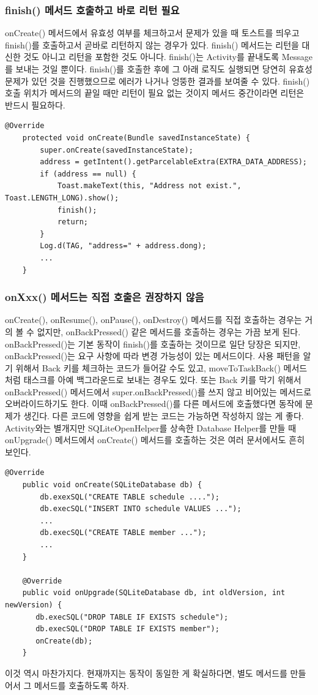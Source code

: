 \subsubsection{finish() 메서드 호출하고 바로 리턴 필요}
onCreate() 메서드에서 유효성 여부를 체크하고서 문제가 있을 때 토스트를 띄우고 finish()를 호출하고서 곧바로 리턴하지 않는 경우가 있다. 
finish() 메서드는 리턴을 대신한 것도 아니고 리턴을 포함한 것도 아니다. finish()는 Activity를 끝내도록 Message를 보내는 것일 뿐이다. 
finish()를 호출한 후에 그 아래 로직도 실행되면 당연히 유효성 문제가 있던 것을 진행했으므로 에러가 나거나 엉뚱한 결과를 보여줄 수 있다. 
finish() 호출 위치가 메서드의 끝일 때만 리턴이 필요 없는 것이지 메서드 중간이라면 리턴은 반드시 필요하다.
\begin{lstlisting}[frame=single] 
	@Override
	protected void onCreate(Bundle savedInstanceState) {
		super.onCreate(savedInstanceState);	
	   	address = getIntent().getParcelableExtra(EXTRA_DATA_ADDRESS);
	  	if (address == null) {
	  		Toast.makeText(this, "Address not exist.", Toast.LENGTH_LONG).show();
	      	finish();
	      	return;
	   	}
	  	Log.d(TAG, "address=" + address.dong);
	  	...
	}
\end{lstlisting}

\subsubsection{onXxx() 메서드는 직접 호출은 권장하지 않음}
onCreate(), onResume(), onPause(), onDestroy() 메서드를 직접 호출하는 경우는 거의 볼 수 없지만, onBackPressed() 같은 메서드를 호출하는 경우는 가끔 보게 된다.
onBackPressed()는 기본 동작이 finish()를 호출하는 것이므로 일단 당장은 되지만, onBackPressed()는 요구 사항에 따라 변경 가능성이 있는 메서드이다.
사용 패턴을 알기 위해서 Back 키를 체크하는 코드가 들어갈 수도 있고, moveToTaskBack() 메서드처럼 태스크를 아예 백그라운드로 보내는 경우도 있다. 
또는 Back 키를 막기 위해서 onBackPressed() 메서드에서 super.onBackPressed()를 쓰지 않고 비어있는 메서드로 오버라이드하기도 한다. 
이때 onBackPressed()를 다른 메서드에 호출했다면 동작에 문제가 생긴다. 
다른 코드에 영향을 쉽게 받는 코드는 가능하면 작성하지 않는 게 좋다.\\

Activity와는 별개지만 SQLiteOpenHelper를 상속한 Database Helper를 만들 때 onUpgrade() 메서드에서 onCreate() 메서드를 호출하는 것은 여러 문서에서도 흔히 보인다.
\begin{lstlisting}[frame=single]
	@Override
	public void onCreate(SQLiteDatabase db) {
	    db.exexSQL("CREATE TABLE schedule ....");
	    db.execSQL("INSERT INTO schedule VALUES ...");
	    ...
	    db.execSQL("CREATE TABLE member ...");
	    ...
	}
	
	@Override
	public void onUpgrade(SQLiteDatabase db, int oldVersion, int newVersion) {
	   db.execSQL("DROP TABLE IF EXISTS schedule");
	   db.execSQL("DROP TABLE IF EXISTS member");
	   onCreate(db);
	}
\end{lstlisting}
이것 역시 마찬가지다. 현재까지는 동작이 동일한 게 확실하다면, 별도 메서드를 만들어서 그 메서드를 호출하도록 하자.

